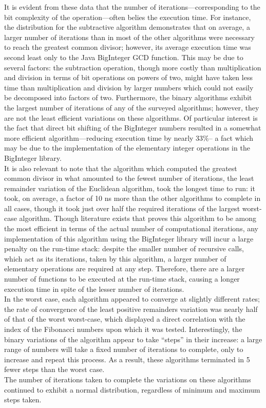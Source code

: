 \documentclass[11pt]{article}
\begin{document}
It is evident from these data that the number of iterations—corresponding to the bit complexity of the operation—often belies the execution time. For instance, the distribution for the subtractive algorithm demonstrates that on average, a larger number of iterations  than in most of the other algorithms were necessary to reach the greatest common divisor; however, its average execution time was second least only to the Java BigInteger GCD function. This may be due to several factors: the subtraction operation, though more costly than multiplication and division in terms of bit operations on powers of two, might have taken less time than multiplication and division by larger numbers which could not easily be decomposed into factors of two. Furthermore, the binary algorithms exhibit the largest number of iterations of any of the surveyed algorithms; however, they are not the least efficient variations on these algorithms. Of particular interest is the fact that direct bit shifting of the BigInteger numbers resulted in a somewhat more efficient algorithm—reducing execution time by nearly 33$\%$-- a fact which may be due to the implementation of the elementary integer operations in the BigInteger library.\\
\indent It is also relevant to note that the algorithm which computed the greatest common divisor in what amounted to the fewest number of iterations, the least remainder variation of the Euclidean algorithm, took the longest time to run: it took, on average, a factor of 10 ns more than the other algorithms to complete in all cases, though it took just over half the required iterations of the largest worst-case algorithm. Though literature exists that proves this algorithm to be among the most efficient in terms of the actual number of computational iterations, any implementation of this algorithm using the BigInteger library will incur a large penalty on the run-time stack:  despite the smaller number of recursive calls, which act as its iterations, taken by this algorithm, a larger number of elementary operations are required at any step. Therefore, there are a larger number of functions to be executed at the run-time stack, causing a longer execution time in spite of the lesser number of iterations.\\
\indent In the worst case, each algorithm appeared to converge at slightly different rates; the rate of convergence of the least positive remainders variation was nearly half of that of the worst worst-case, which displayed a direct correlation with the index of the Fibonacci numbers upon which it was tested. Interestingly, the binary variations of the algorithm appear to take “steps” in their increase: a large range of numbers will take a fixed number of iterations to complete, only to increase and repeat this process. As a result, these algorithms terminated in 5 fewer steps than the worst case.\\
The number of iterations taken to complete the variations on these algorithms continued to exhibit a normal distribution, regardless of minimum and maximum steps taken.
\end{document}
